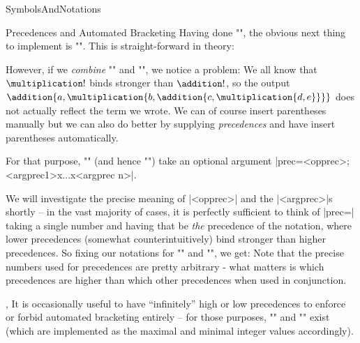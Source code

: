 \begin{smodule}[ns=https://github.com/slatex/sTeX/doc]{SymbolsAndNotations}
\begin{sfragment}{Precedences and Automated Bracketing}
    Having done \stexcode"\addition", the obvious next
    thing to implement is \stexcode"\multiplication".
    This is straight-forward in theory:


    However, if we \emph{combine} \stexcode"\addition" and
    \stexcode"\multiplication", we notice a problem:
    We all know that $\multiplication!$ binds stronger than $\addition!$,
    so the output $\addition{a,\multiplication{b,\addition{c,\multiplication{d,e}}}}$
    does not actually reflect the term we wrote. We can of course
    insert parentheses manually
    but we can also do better by supplying \emph{precedences} and
    have \sTeX insert parentheses automatically.

    For that purpose, \stexcode"\notation" (and hence \stexcode"\symdef")
    take an optional argument |prec=<opprec>;<argprec1>x...x<argprec n>|.

    We will investigate the precise meaning of |<opprec>| and the
    |<argprec>|s shortly -- in the vast majority of cases, it is
    perfectly sufficient to think of |prec=| taking a single number
    and having that be \emph{the} precedence of the notation,
    where lower precedences 
    (somewhat counterintuitively) bind stronger than higher precedences.
    So fixing our notations for \stexcode"\addition" and
    \stexcode"\multiplication", we get:
    Note that the precise numbers used for precedences are pretty
    arbitrary - what matters is which precedences are higher than
    which other precedences when used in conjunction.
    \begin{variable}{\infprec,\neginfprec}
        It is occasionally useful to have ``infinitely'' high
        or low precedences to enforce or forbid
        automated bracketing entirely -- for those purposes,
        \stexcode"\infprec"
        and \stexcode"\neginfprec" exist (which are implemented
        as the maximal and minimal integer values accordingly).
    \end{variable}


\end{sfragment}
\end{smodule}
